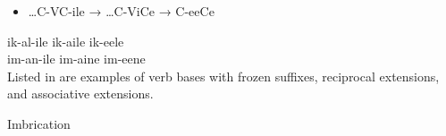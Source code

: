 \documentclass[output=paper]{langsci/langscibook}
\begin{document}
\begin{itemize}
\item \begin{stylelsLanginfo}
 …C-VC-ile  →  …C-ViCe  →  C-eeCe  
\end{stylelsLanginfo}\end{itemize}
\gll ik-al-ile        ik-aile    ik-eele\\
\gll im-an-ile        im-aine    im-eene\\
Listed in  are examples of verb bases with frozen suffixes, reciprocal extensions, and associative extensions.

\begin{stylelsTableHeading}%
\begin{table}
\caption{Imbrication}
\label{tab:20}
\end{table}\end{stylelsTableHeading}
\end{document}
